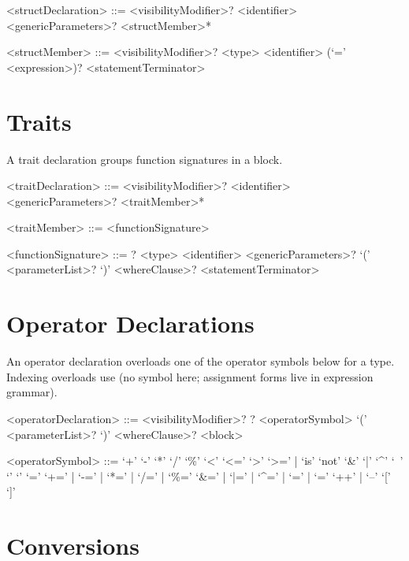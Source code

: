 \documentclass[makeidx]{article}
\begin{document}
\begin{grammar}
<structDeclaration> ::= <visibilityModifier>? \STRUCT{} <identifier>
  \gnewline{} <genericParameters>? \HAS{} <structMember>* \END{}

<structMember> ::= <visibilityModifier>? <type> <identifier>
  \gnewline{} (`=' <expression>)? <statementTerminator>
\end{grammar}

\section{Traits}

\LMHash{}%
A trait declaration groups function signatures in a  block.

\begin{grammar}
<traitDeclaration> ::= <visibilityModifier>? \TRAIT{} <identifier>
  \gnewline{} <genericParameters>? \HAS{} <traitMember>* \END{}

<traitMember> ::= <functionSignature>

<functionSignature> ::= \SEALED{}? <type> <identifier>
  \gnewline{} <genericParameters>? `(' <parameterList>? `)'
  \gnewline{} <whereClause>? <statementTerminator>
\end{grammar}

\section{Operator Declarations}

\LMHash{}%
An operator declaration overloads one of the operator symbols below for
a type. Indexing overloads use \code{[]} (no \code{[]=} symbol here;
assignment forms live in expression grammar).

\begin{grammar}
<operatorDeclaration> ::= <visibilityModifier>? \STATIC{}? \OPERATOR{}
  \gnewline{} <operatorSymbol> `(' <parameterList>? `)'
  \gnewline{} <whereClause>? <block>

<operatorSymbol> ::= `+'
  \alt `-'
  \alt `*'
  \alt `/'
  \alt `\%'
  \alt `<'
  \alt `<='
  \alt `>'
  \alt `>='
  \alt \IS{} | `is' `not'
  \alt `\&'
  \alt `|'
  \alt `^'
  \alt `~'
  \alt `\ltlt'
  \alt `\gtgt'
  \alt `='
  \alt `+=' | `-=' | `*=' | `/=' | `\%='
  \alt `\&=' | `|=' | `^=' | `\ltlt=' | `\gtgt='
  \alt `++' | `--'
  \alt `[' `]'
\end{grammar}

\section{Conversions}
\end{document}
